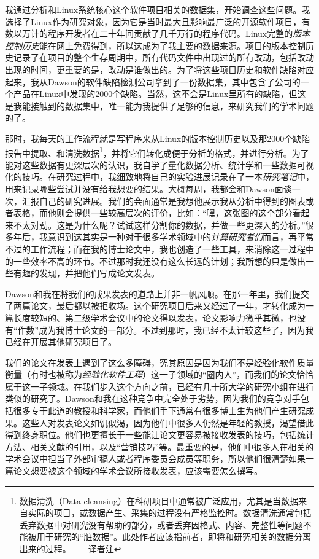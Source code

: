 \documentclass[12pt,UTF8,nofonts]{book}
\begin{document}
我通过分析和Linux系统核心这个软件项目相关的数据集，开始调查这些问题。我选择了Linux作为研究对象，因为它是当时最大且影响最广泛的开源软件项目，有数以万计的程序开发者在二十年间贡献了几千万行的程序代码。Linux完整的\emph{版本控制历史}能在网上免费得到，所以这成为了我主要的数据来源。项目的版本控制历史记录了在项目的整个生存周期中，所有代码文件中出现过的所有改动，包括改动出现的时间，更重要的是，改动是谁做出的。为了将这些项目历史和软件缺陷对应起来，我从Dawson的软件缺陷检测公司拿到了一份数据集，其中包含了公司的一个产品在Linux中发现的2000个缺陷。当然，这不会是Linux里所有的缺陷，但这是我能接触到的数据集中，唯一能为我提供了足够的信息，来研究我们的学术问题的了。

那时，我每天的工作流程就是写程序来从Linux的版本控制历史以及那2000个缺陷报告中提取、和清洗数据\footnote{数据清洗（Data cleansing）在科研项目中通常被广泛应用，尤其是当数据来自实际的项目，或数据产生、采集的过程没有严格监控时。数据清洗通常包括丢弃数据中对研究没有帮助的部分，或者丢弃因格式、内容、完整性等问题不能被用于研究的“脏数据”。此处作者应该指前者，即将和研究相关的数据分离出来的过程。——译者注}，并将它们转化成便于分析的格式，并进行分析。为了能对这些数据有更深层次的认识，我自学了量化数据分析、统计学和一些数据可视化的技巧。在研究过程中，我细致地将自己的实验进展记录在了一本\emph{研究笔记}中，用来记录哪些尝试并没有给我想要的结果。大概每周，我都会和Dawson面谈一次，汇报自己的研究进展。我们的会面通常是我想他展示我从分析中得到的图表或者表格，而他则会提供一些较高层次的评价，比如：“嘿，这张图的这个部分看起来不太对劲。这是为什么呢？试试这样分割你的数据，并做一些更深入的分析。”很多年后，我意识到这其实是一种对于很多学术领域中的\emph{计算研究者们}而言，再平常不过的工作流程；而在我的博士论文中，我也创造了一些工具，来消除这一过程中的一些效率不高的环节。不过那时我还没有这么长远的计划；我所想的只是做出一些有趣的发现，并把他们写成论文发表。

\breakline

Dawson和我在将我们的成果发表的道路上并非一帆风顺。在那一年里，我们提交了两篇论文，最后都以被拒收场。这个研究项目后来又经过了一年，才转化成为一篇长度较短的、第二级学术会议中的论文得以发表，论文影响力微乎其微，也没有“作数”成为我博士论文的一部分。不过到那时，我已经不太计较这些了，因为我已经在开展其他研究项目了。

我们的论文在发表上遇到了这么多障碍，究其原因是因为我们不是经验化软件质量衡量（有时也被称为\emph{经验化软件工程}）这一子领域的“圈内人”，而我们的论文恰恰属于这一子领域。在我们步入这个方向之前，已经有几十所大学的研究小组在进行类似的研究了。Dawson和我在这种竞争中完全处于劣势，因为我们的竞争对手包括很多专于此道的教授和科学家，而他们手下通常有很多博士生为他们产生研究成果。这些人对发表论文如饥似渴，因为他们中很多人仍然是年轻的教授，渴望借此得到终身职位。他们也更擅长于一些能让论文更容易被接收发表的技巧，包括统计方法、相关文献的引用，以及“营销技巧”等。最重要的是，他们中很多人在相关的学术会议中担当了外部审稿人或者程序委员会成员等职务，所以他们很清楚如果一篇论文想要被这个领域的学术会议所接收发表，应该需要怎么撰写。
\end{document}
